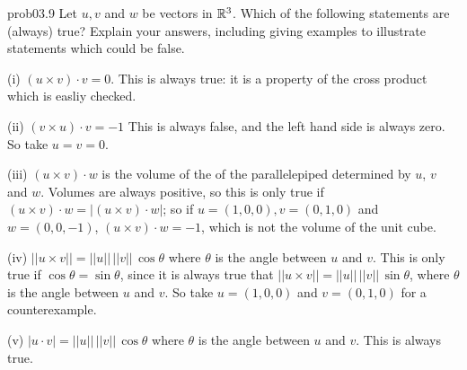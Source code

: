  \begin{sol}{prob03.9}  Let $u , v $ and $w $ be vectors in $\mathbb{R}^3$.  Which of the following 
statements are (always) true? Explain your answers, including  giving examples to illustrate statements which could be false. 
\medskip

(i)  $(u\times v)\cdot v=0$. \soln This is always true: it is a property of the cross product which is easliy checked.
 
\medskip

(ii)  $(v\times u)\cdot v=-1$ \soln This is always false, and the left hand side is always zero. So take $u=v=0$.
 
\medskip

(iii)  $(u\times v)\cdot w$ is the volume of the of the parallelepiped  determined by $u$, $v$ and $w$. \soln Volumes are always positive, so this is only true if $(u\times v)\cdot w= |(u\times v)\cdot w|$; so if $u=(1,0,0), v=(0,1,0)$ and $w=(0,0,-1)$, $(u\times v)\cdot w=-1$, which is not the volume of the unit cube.  
 
\medskip

(iv)  $||u\times v||=||u||\,||v||\,\cos\theta$
where $\theta$ is the angle between $u$ and $v$. \soln This is only true if $\cos\theta=\sin \theta$, since it is always true that $||u\times v||=||u||\,||v||\,\sin\theta$, where $\theta$ is the angle between $u$ and $v$. So take $u=(1,0,0)$ and $v=(0,1,0)$ for a counterexample.

\medskip 

(v)  $|u\cdot v|=||u||\,||v||\,\cos\theta$
where $\theta$ is the angle between $u$ and $v$. \soln This is always true.
 
\end{sol} 


